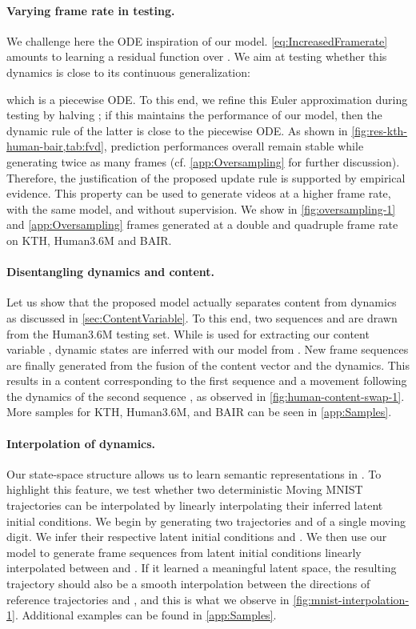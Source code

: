 \documentclass{article}
\begin{document}
\paragraph{Varying frame rate in testing.}

We challenge here the ODE inspiration of our model.
\cref{eq:IncreasedFramerate} amounts to learning a residual function  over .
We aim at testing whether this dynamics is close to its continuous generalization:

which is a piecewise ODE.
To this end, we refine this Euler approximation during testing by halving ; if this maintains the performance of our model, then the dynamic rule of the latter is close to the piecewise ODE.
As shown in \cref{fig:res-kth-human-bair,tab:fvd}, prediction performances overall remain stable while generating twice as many frames (cf. \cref{app:Oversampling} for further discussion).
Therefore, the justification of the proposed update rule is supported by empirical evidence.
This property can be used to generate videos at a higher frame rate, with the same model, and without supervision.
We show in \cref{fig:oversampling-1} and \cref{app:Oversampling} frames generated at a double and quadruple frame rate on KTH, Human3.6M and BAIR.

\paragraph{Disentangling dynamics and content.}

Let us show that the proposed model actually separates content from dynamics as discussed in \cref{sec:ContentVariable}.
To this end, two sequences  and  are drawn from the Human3.6M testing set.
While  is used for extracting our content variable , dynamic states  are inferred with our model from  .
New frame sequences  are finally generated from the fusion of the content vector and the dynamics.
This results in a content corresponding to the first sequence  and a movement following the dynamics of the second sequence , as observed in \cref{fig:human-content-swap-1}.
More samples for KTH, Human3.6M, and BAIR can be seen in \cref{app:Samples}.

\paragraph{Interpolation of dynamics.}

Our state-space structure allows us to learn semantic representations in .
To highlight this feature, we test whether two deterministic Moving MNIST trajectories can be interpolated by linearly interpolating their inferred latent initial conditions.
We begin by generating two trajectories  and  of a single moving digit.
We infer their respective latent initial conditions  and .
We then use our model to generate frame sequences from latent initial conditions linearly interpolated between  and .
If it learned a meaningful latent space, the resulting trajectory should also be a smooth interpolation between the directions of reference trajectories  and , and this is what we observe in \cref{fig:mnist-interpolation-1}. 
Additional examples can be found in \cref{app:Samples}.
 
\end{document}
